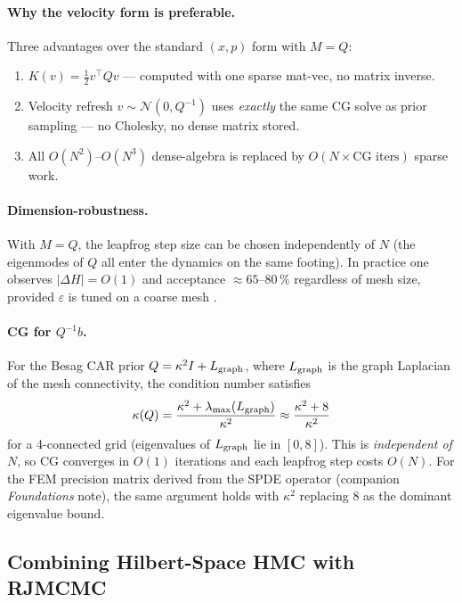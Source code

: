 \documentclass[11pt]{article}
\begin{document}
\paragraph{Why the velocity form is preferable.}
Three advantages over the standard $(x, p)$ form with $M = Q$:
\begin{enumerate}
  \item $K(v) = \tfrac{1}{2}v^\top Qv$ — computed with one sparse mat-vec, no
        matrix inverse.
  \item Velocity refresh $v \sim \mathcal{N}(0, Q^{-1})$ uses \emph{exactly} the same
        CG solve as prior sampling — no Cholesky, no dense matrix stored.
  \item All $O(N^2)$--$O(N^3)$ dense-algebra is replaced by $O(N \times
        \text{CG iters})$ sparse work.
\end{enumerate}

\paragraph{Dimension-robustness.}
With $M = Q$, the leapfrog step size can be chosen independently of $N$ (the
eigenmodes of $Q$ all enter the dynamics on the same footing).  In practice
one observes $|\Delta H| = O(1)$ and acceptance $\approx 65$--$80\,\%$ regardless
of mesh size, provided $\varepsilon$ is tuned on a coarse mesh \citep{beskos2011,
hairer2014}.

\paragraph{CG for $Q^{-1}b$.}
\label{sec:cg}
For the Besag CAR prior $Q = \kappa^2 I + L_{\rm graph}$, where $L_{\rm graph}$
is the graph Laplacian of the mesh connectivity, the condition number satisfies
\begin{equation}
  \kappa(Q) = \frac{\kappa^2 + \lambda_{\max}(L_{\rm graph})}{\kappa^2}
            \approx \frac{\kappa^2 + 8}{\kappa^2}
\end{equation}
for a 4-connected grid (eigenvalues of $L_{\rm graph}$ lie in $[0,8]$).  This is
\emph{independent of $N$}, so CG converges in $O(1)$ iterations and each leapfrog
step costs $O(N)$.  For the FEM precision matrix derived from the SPDE operator
(companion \emph{Foundations} note), the same argument holds with $\kappa^2$
replacing 8 as the dominant eigenvalue bound.

\subsection{Combining Hilbert-Space HMC with RJMCMC}
\label{sec:rjmcmc-hmc}
\end{document}
